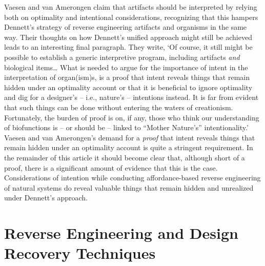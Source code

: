 Vaesen and van Amerongen claim that artifacts should be interpreted by
relying both on optimality and intentional considerations, recognizing
that this hampers Dennett’s strategy of reverse engineering artifacts
and organisms in the same way.\citep[][pgs. 794--795]{vaesenamerongen2008} Their thoughts on
how Dennett’s unified approach might still be achieved leads to an
interesting final paragraph. They write, ‘Of course, it still might be
possible to establish a generic interpretive program, including
artifacts \textit{and} biological items… What is needed to argue for
the importance of intent in the interpretation of organ(ism)s, is a
proof that intent reveals things that remain hidden under an optimality
account or that it is beneficial to ignore optimality and dig for a
designer’s – i.e., nature’s – intentions instead. It is far from
evident that such things can be done without entering the waters of
creationism. Fortunately, the burden of proof is on, if any, those who
think our understanding of biofunctions is – or should be – linked to
“Mother Nature’s” intentionality.’\citep[][pg. 795]{vaesenamerongen2008} Vaesen and van
Amerongen’s demand for a \textit{proof} that intent reveals things that
remain hidden under an optimality account is quite a stringent
requirement. In the remainder of this article it should become clear
that, although short of a proof, there is a significant amount of
evidence that this is the case. Considerations of intention while
conducting affordance-based reverse engineering of natural systems do
reveal valuable things that remain hidden and unrealized under
Dennett’s approach.

\section{Reverse Engineering and Design Recovery Techniques}

